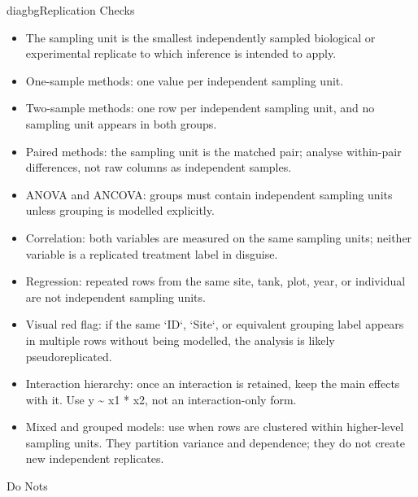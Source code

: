 \documentclass[9pt,landscape]{extarticle}
\newcommand{\Rc}[1]{{\ttfamily\color{codeblue}#1}}
\newlength{\tableblockwidth}
\newlength{\tableoffset}
\begin{document}
\noindent\hspace*{\tableoffset}%
\begin{minipage}{\tableblockwidth}

\vspace{3pt}

\begin{tcbraster}[
  raster columns=3,
  raster equal height=rows,
  raster column skip=4mm,
  raster left skip=0pt,
  raster right skip=0pt
]
\begin{infopanelbox}{diagbg}{Replication Checks}
\begin{itemize}[leftmargin=*, itemsep=2pt, topsep=2pt]
\item The sampling unit is the smallest independently sampled biological or experimental replicate to which inference is intended to apply.
\item One-sample methods: one value per independent sampling unit.
\item Two-sample methods: one row per independent sampling unit, and no sampling unit appears in both groups.
\item Paired methods: the sampling unit is the matched pair; analyse within-pair differences, not raw columns as independent samples.
\item ANOVA and ANCOVA: groups must contain independent sampling units unless grouping is modelled explicitly.
\item Correlation: both variables are measured on the same sampling units; neither variable is a replicated treatment label in disguise.
\item Regression: repeated rows from the same site, tank, plot, year, or individual are not independent sampling units.
\item Visual red flag: if the same `ID`, `Site`, or equivalent grouping label appears in multiple rows without being modelled, the analysis is likely pseudoreplicated.
\item Interaction hierarchy: once an interaction is retained, keep the main effects with it. Use \Rc{y \textasciitilde{} x1 * x2}, not an interaction-only form.
\item Mixed and grouped models: use when rows are clustered within higher-level sampling units. They partition variance and dependence; they do not create new independent replicates.
\end{itemize}
\end{infopanelbox}
\begin{warnpanelbox}{Do Nots}

\end{warnpanelbox}
\end{tcbraster}
\end{minipage}
\end{document}
